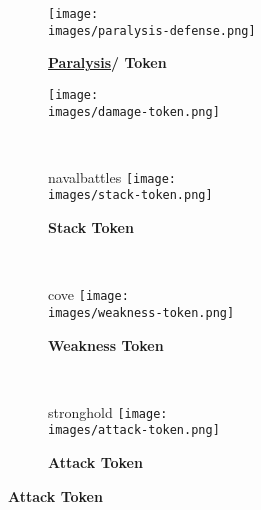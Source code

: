 \vspace*{-1em}
\begin{figure}[H]
  \centering
  \begin{subfigure}[c]{0.17\linewidth}
    \centering
    \texttt{[image: \\images/paralysis-defense.png]}
    \caption{\textbf{\hyperlink{Paralysis}{Paralysis}/  Token}}
  \end{subfigure}
  \begin{subfigure}[c]{0.1\linewidth}
    \centering
    \texttt{[image: \\images/damage-token.png]}
    \caption{\textbf{}}
  \end{subfigure}
  ~
  \begin{subfigure}[c]{0.15\linewidth}
    \begin{expansionmini}{navalbattles}
      \centering
      \vspace{0.5em}
      \texttt{[image: \\images/stack-token.png]}
      \caption{\textbf{Stack Token \phantom{Population}}}
    \end{expansionmini}
  \end{subfigure}
  ~
  \begin{subfigure}[c]{0.15\linewidth}
    \begin{expansionmini}{cove}
      \centering
      \vspace{0.5em}
      \texttt{[image: \\images/weakness-token.png]}
      \caption{\textbf{Weakness Token}}
    \end{expansionmini}
  \end{subfigure}
  ~
  \begin{subfigure}[c]{0.15\linewidth}
    \begin{expansionmini}{stronghold}
      \centering
      \vspace{0.5em}
      \texttt{[image: \\images/attack-token.png]}
      \caption{\textbf{Attack Token}}
    \end{expansionmini}
  \end{subfigure}
\end{figure}

